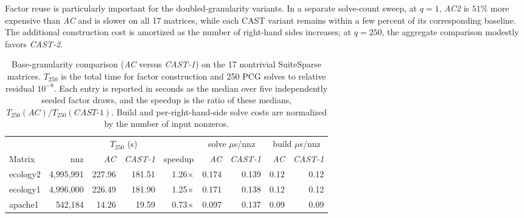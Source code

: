 \documentclass{article}
\newcommand{\CASTone}{\textit{CAST-1}\xspace}
\newcommand{\CASTtwo}{\textit{CAST-2}\xspace}
\newcommand{\AC}{\textit{AC}\xspace}
\newcommand{\ACtwo}{\textit{AC2}\xspace}
\newcommand{\1}{\mathbbm{1}}
\theoremstyle{plain}
\begin{document}
Factor reuse is particularly important for the doubled-granularity
variants. In a separate solve-count sweep, at $q=1$, \ACtwo is
$51\%$ more expensive than \AC and is slower on
all 17 matrices, while each CAST variant remains within a few percent
of its corresponding baseline. The additional construction cost is
amortized as the number of right-hand sides increases; at $q=250$,
the aggregate comparison modestly favors \CASTtwo.


 
\begin{table}[!t]

\centering

\caption{Base-granularity comparison (\AC versus \CASTone) on the
17 nontrivial SuiteSparse matrices. $T_{250}$ is the total time for
factor construction and 250 PCG solves to relative residual
$10^{-8}$. Each entry is reported in seconds as the median over five
independently seeded factor draws, and the speedup is the ratio of
these medians, 
$T_{250}(\AC)/T_{250}(\CASTone)$. Build and per-right-hand-side solve
costs are normalized by the number of input nonzeros.}

\label{tab:tier1}

\small

\begin{tabular}{l r rr r rr rr}

\toprule

& & \multicolumn{2}{c}{$T_{250}$ (s)} & &

\multicolumn{2}{c}{solve $\mu$s/nnz} &

\multicolumn{2}{c}{build $\mu$s/nnz} \\

\cmidrule(lr){3-4}\cmidrule(lr){6-7}\cmidrule(lr){8-9}

Matrix & nnz & \AC & \CASTone & speedup &

\AC & \CASTone & \AC & \CASTone \\

\midrule

ecology2         & 4{,}995{,}991 & 227.96 & 181.51 & 1.26$\times$ & 0.174 & 0.139 & 0.12 & 0.12 \\

ecology1         & 4{,}996{,}000 & 226.49 & 181.90 & 1.25$\times$ & 0.171 & 0.138 & 0.12 & 0.12 \\

apache1          &   542{,}184 &  14.26 &  19.59 & 0.73$\times$ & 0.097 & 0.137 & 0.09 & 0.09 \\


\end{tabular}
\end{table}
\end{document}
